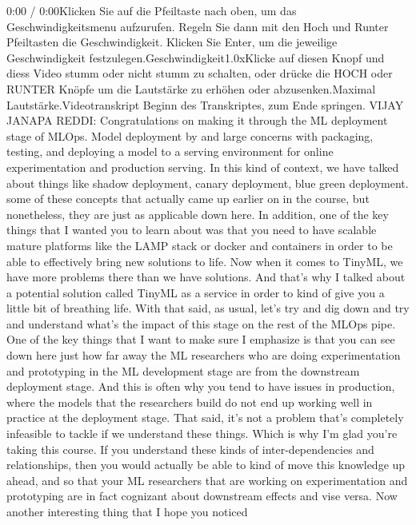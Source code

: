 {{{{{{    0:00 / 0:00Klicken Sie auf die Pfeiltaste nach oben, um das Geschwindigkeitsmenu aufzurufen. Regeln Sie dann mit den Hoch und Runter Pfeiltasten die Geschwindigkeit. Klicken Sie Enter, um die jeweilige Geschwindigkeit festzulegen.Geschwindigkeit1.0xKlicke auf diesen Knopf und diess Video stumm oder nicht stumm zu schalten, oder drücke die HOCH oder RUNTER Knöpfe um die Lautstärke zu erhöhen oder abzusenken.Maximal Lautstärke.Videotranskript
    Beginn des Transkriptes, zum Ende springen.
    VIJAY JANAPA REDDI: Congratulations on making it through the ML deployment
    stage of MLOps.
    Model deployment by and large concerns with packaging, testing,
    and deploying a model to a serving environment for online experimentation
    and production serving.
    In this kind of context, we have talked about things like shadow deployment,
    canary deployment, blue green deployment.
    some of these concepts that actually came up earlier on in the course,
    but nonetheless, they are just as applicable down here.
    In addition, one of the key things that I wanted you to learn about
    was that you need to have scalable mature platforms like the LAMP stack
    or docker and containers in order to be able to effectively bring
    new solutions to life.
    Now when it comes to TinyML, we have more problems
    there than we have solutions.
    And that's why I talked about a potential solution called TinyML
    as a service in order to kind of give you a little bit of breathing life.
    With that said, as usual, let's try and dig down and try and understand
    what's the impact of this stage on the rest of the MLOps pipe.
    One of the key things that I want to make sure I emphasize
    is that you can see down here just how far away the ML researchers who
    are doing experimentation and prototyping in the ML development stage
    are from the downstream deployment stage.
    And this is often why you tend to have issues in production,
    where the models that the researchers build
    do not end up working well in practice at the deployment stage.
    That said, it's not a problem that's completely infeasible to tackle
    if we understand these things.
    Which is why I'm glad you're taking this course.
    If you understand these kinds of inter-dependencies and relationships,
    then you would actually be able to kind of move this knowledge up ahead, and so
    that your ML researchers that are working on experimentation
    and prototyping are in fact cognizant about downstream effects and vise
    versa.
    Now another interesting thing that I hope you noticed
}}}}}}
